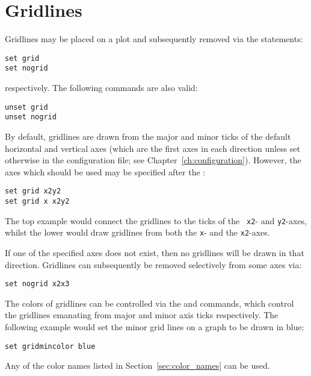 \section{Gridlines}

Gridlines may be placed on a plot and subsequently removed via the statements:

\begin{verbatim}
set grid
set nogrid
\end{verbatim}

\noindent respectively. The following commands are also valid:

\begin{verbatim}
unset grid
unset nogrid
\end{verbatim}

\noindent By default, gridlines are drawn from the major and minor ticks of the
default horizontal and vertical axes (which are the first axes in each
direction unless set otherwise in the configuration file; see
Chapter~\ref{ch:configuration}).  However, the axes which should be used may be
specified after the :

\begin{verbatim}
set grid x2y2
set grid x x2y2
\end{verbatim}

\noindent The top example would connect the gridlines to the ticks of the {\tt
x2}- and {\tt y2}-axes, whilst the lower would draw gridlines from both the
{\tt x}- and the {\tt x2}-axes.

If one of the specified axes does not exist, then no gridlines will be drawn in
that direction.  Gridlines can subsequently be removed selectively from some
axes via:

\begin{verbatim}
set nogrid x2x3
\end{verbatim}

\label{sec:set_colors}
The colors of gridlines can be
controlled via the  and  commands, which control the gridlines emanating from major and
minor axis ticks respectively. The following example would set the minor grid
lines on a graph to be drawn in blue:

\begin{verbatim}
set gridmincolor blue
\end{verbatim}

\noindent Any of the color names listed in Section~\ref{sec:color_names} can
be used.

